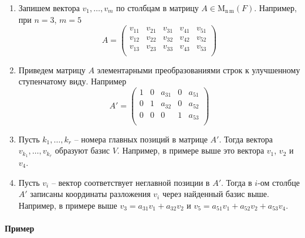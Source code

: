 \documentclass{article}
\newcommand{\MatrixDim}[3]{\operatorname{\mathrm{M}_{#2\,#3}}(#1)}
\begin{document}
\begin{enumerate}
\item Запишем вектора $v_1,\ldots,v_m$ по столбцам в матрицу $A \in \MatrixDim{F}{n}{m}$.
Например, при $n = 3$, $m = 5$
\[
A = 
\begin{pmatrix}
{v_{11}}&{v_{21}}&{v_{31}}&{v_{41}}&{v_{51}}\\
{v_{12}}&{v_{22}}&{v_{32}}&{v_{42}}&{v_{52}}\\
{v_{13}}&{v_{23}}&{v_{33}}&{v_{43}}&{v_{53}}\\
\end{pmatrix}
\]

\item Приведем матрицу $A$ элементарными преобразованиями строк к улучшенному ступенчатому виду.
Например
\[
A' = 
\begin{pmatrix}
{1}&{0}&{a_{31}}&{0}&{a_{51}}\\
{0}&{1}&{a_{32}}&{0}&{a_{52}}\\
{0}&{0}&{0}&{1}&{a_{53}}\\
\end{pmatrix}
\]

\item Пусть $k_1,\ldots,k_r$ -- номера главных позиций в матрице $A'$.
Тогда вектора $v_{k_1},\ldots,v_{k_r}$ образуют базис $V$.
Например, в примере выше это вектора $v_1$, $v_2$ и $v_4$.

\item Пусть $v_i$ -- вектор соответствует неглавной позиции в $A'$.
Тогда в $i$-ом столбце $A'$ записаны координаты разложения $v_i$ через найденный базис выше.
Например, в примере выше $v_3 = a_{31}v_1 + a_{32}v_2$ и $v_5 = a_{51}v_1 + a_{52}v_2 + a_{53}v_4$.
\end{enumerate}

\paragraph{Пример}
\end{document}
